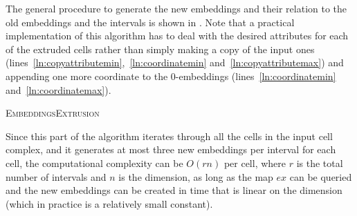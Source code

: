 The general procedure to generate the new embeddings and their relation to the old embeddings and the intervals is shown in .
Note that a practical implementation of this algorithm has to deal with the desired attributes for each of the extruded cells rather than simply making a copy of the input ones (lines~\ref{ln:copyattributemin},~\ref{ln:coordinatemin} and~\ref{ln:copyattributemax}) and appending one more coordinate to the 0-embeddings (lines~\ref{ln:coordinatemin} and~\ref{ln:coordinatemax}).

\begin{algorithm}[tb]
\small
{}
\DontPrintSemicolon{}
\caption{\textsc{EmbeddingsExtrusion}}\label{algo:embeddingsextrusion}
\end{algorithm}

Since this part of the algorithm iterates through all the cells in the input cell complex, and it generates at most three new embeddings per interval for each cell, the computational complexity can be $O(rn)$ per cell, where $r$ is the total number of intervals and $n$ is the dimension, as long as the map $ex$ can be queried and the new embeddings can be created in time that is linear on the dimension (which in practice is a relatively small constant).


